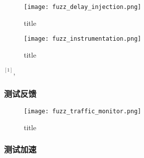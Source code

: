 \begin{figure}[h]
    \centering
    \texttt{[image: fuzz\_delay\_injection.png]}
    \caption{ title}
    \label{pic:fdi}
\end{figure}

\begin{figure}[h]
    \centering
    \texttt{[image: fuzz\_instrumentation.png]}
    \caption{ title}
    \label{pic:fi}
\end{figure}

$^{[1]}$, 

\subsubsection{测试反馈}
\begin{figure}[h]
    \centering
    \texttt{[image: fuzz\_traffic\_monitor.png]}
    \caption{ title}
    \label{pic:ftm}
\end{figure}
\subsubsection{测试加速}

